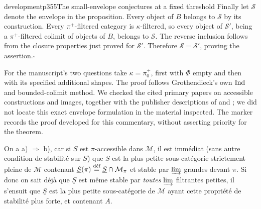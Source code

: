 \begin{dcomment}{development}{p355}{The small-envelope conjectures at a fixed threshold}
Finally let $\mathcal S$ denote the envelope in the proposition. Every object of $B$ belongs to $\mathcal S$ by its construction. Every $\pi^+$-filtered category is $\kappa$-filtered, so every object of $\mathcal S'$, being a $\pi^+$-filtered colimit of objects of $B$, belongs to $\mathcal S$. The reverse inclusion follows from the closure properties just proved for $\mathcal S'$. Therefore $\mathcal S=\mathcal S'$, proving the assertion.\hfill$\square$

For the manuscript's two questions take $\kappa=\pi_0^+$, first with $\Phi$ empty and then with its specified additional shapes. The proof follows Grothendieck's own $\Ind$ and bounded-colimit method. We checked the cited primary papers on accessible constructions and images, together with the publisher descriptions of \citet{MakkaiPare1989} and \citet{AdamekRosicky1994}; we did not locate this exact envelope formulation in the material inspected. The marker records the proof developed for this commentary, without asserting priority for the theorem.
\end{dcomment}


On a a) $\Longrightarrow$ b), car si $\underline{S}$ est $\pi$-accessible dans $\mathcal{M}$, il est immédiat (sans autre condition de stabilité sur $\underline{S}$) que $\underline{S}$ est la plus petite sous-catégorie strictement pleine de $\mathcal{M}$ contenant $\underline{S}(\pi) \defeq \underline{S}\cap\mathcal{M}_\pi$ et stable par $\limind$ grandes devant $\pi$. Si donc on sait déjà que $\underline{S}$ est même stable par \textit{toutes} $\limind$ filtrantes petites, il s'ensuit que $\underline{S}$ est la plus petite sous-catégorie de $\mathcal{M}$ ayant cette propriété de stabilité plus forte, et contenant $A$.

